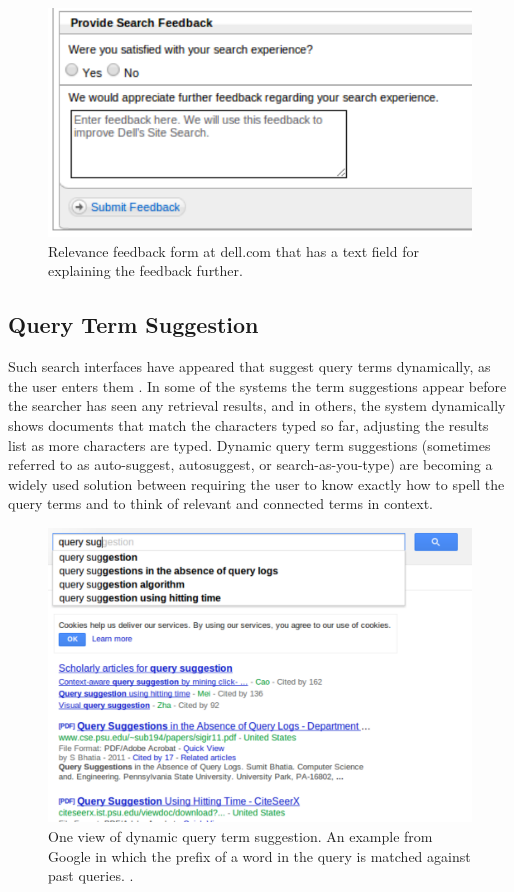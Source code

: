 \documentclass{sigchi}
\begin{document}
\begin{figure}[htp] %
\caption{Relevance feedback form at dell.com that has a text field for explaining the feedback further.\protect} \label{figure_relevanceFeedback2}
\includegraphics[scale=0.70]{figures/relevanceFeedback2.pdf} 
\end{figure}

\subsection{Query Term Suggestion}

Such search interfaces have appeared that suggest query terms dynamically, as the user enters them \cite{huang03}.
In some of the systems the term suggestions appear before the searcher has seen any retrieval results, and in others, the system dynamically shows documents that match the characters typed so far, adjusting the results list as more characters are typed.
Dynamic query term suggestions (sometimes referred to as auto-suggest, autosuggest, or search-as-you-type) are becoming a widely used solution between requiring the user to know exactly how to spell the query terms and to think of relevant and connected terms in context.

\begin{figure}[htp] %
\caption{One view of dynamic query term suggestion. An example from Google in which the prefix of a word in the query is matched against past queries. \protect.} \label{figure_querysuggestion2}
\includegraphics[scale=0.41]{figures/dynamicQueryTermSuggestion2.pdf} 
\end{figure}
\end{document}
